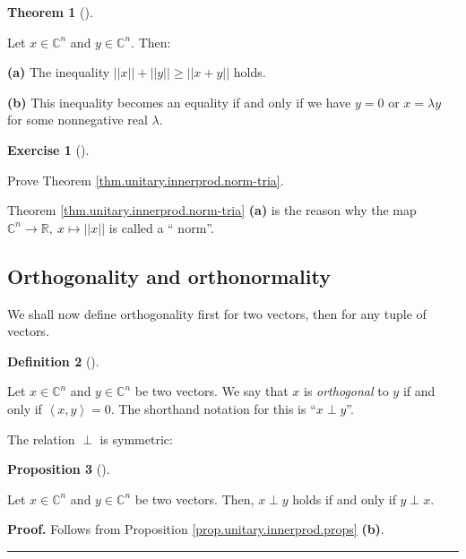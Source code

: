 \documentclass[numbers=enddot,12pt,final,onecolumn,notitlepage]{scrartcl}%
\newcounter{exer}
\numberwithin{exer}{subsection}
\theoremstyle{definition}
\newtheorem{theo}{Theorem}[subsection]
\newenvironment{theorem}[1][]
{\begin{theo}[#1]\begin{leftbar}}
{\end{leftbar}\end{theo}}
\newtheorem{prop}[theo]{Proposition}
\newenvironment{proposition}[1][]
{\begin{prop}[#1]\begin{leftbar}}
{\end{leftbar}\end{prop}}
\newtheorem{defi}[theo]{Definition}
\newenvironment{definition}[1][]
{\begin{defi}[#1]\begin{leftbar}}
{\end{leftbar}\end{defi}}
\newtheorem{exmp}[exer]{Exercise}
\newenvironment{exercise}[1][]
{\begin{exmp}[#1]\begin{leftbar}}
{\end{leftbar}\end{exmp}}
\newenvironment{proof}[1][Proof]{\noindent\textbf{#1.} }{\ \rule{0.5em}{0.5em}}
\begin{document}
\begin{theorem}
[triangle inequality]\label{thm.unitary.innerprod.norm-tria} Let
$x\in\mathbb{C}^{n}$ and $y\in\mathbb{C}^{n}$. Then:

\textbf{(a)} The inequality $\left\vert \left\vert x\right\vert \right\vert
+\left\vert \left\vert y\right\vert \right\vert \geq\left\vert \left\vert
x+y\right\vert \right\vert $ holds.

\textbf{(b)} This inequality becomes an equality if and only if we have $y=0$
or $x=\lambda y$ for some nonnegative real $\lambda$.
\end{theorem}

\begin{exercise}
\label{exe.unitary.innerprod.norm-tria} Prove Theorem
\ref{thm.unitary.innerprod.norm-tria}.
\end{exercise}

Theorem \ref{thm.unitary.innerprod.norm-tria} \textbf{(a)} is the reason why
the map $\mathbb{C}^{n}\rightarrow\mathbb{R},\ x\mapsto\left\vert \left\vert
x\right\vert \right\vert $ is called a \textquotedblleft
norm\textquotedblright.

\subsection{Orthogonality and orthonormality}

We shall now define orthogonality first for two vectors, then for any tuple of vectors.

\begin{definition}
\label{def.unitary.innerprod.orth}Let $x\in\mathbb{C}^{n}$ and $y\in
\mathbb{C}^{n}$ be two vectors. We say that $x$ is \emph{orthogonal} to $y$ if
and only if $\left\langle x,y\right\rangle =0$. The shorthand notation for
this is \textquotedblleft$x\perp y$\textquotedblright.
\end{definition}

The relation $\perp$ is symmetric:

\begin{proposition}
\label{prop.unitary.innerprod.orth-symm}Let $x\in\mathbb{C}^{n}$ and
$y\in\mathbb{C}^{n}$ be two vectors. Then, $x\perp y$ holds if and only if
$y\perp x$.
\end{proposition}

\begin{proof}
Follows from Proposition \ref{prop.unitary.innerprod.props} \textbf{(b)}.
\end{proof}
\end{document}
